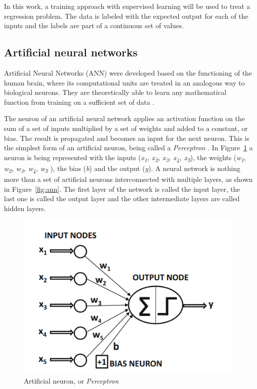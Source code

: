 \documentclass[a4paper,fleqn]{cas-sc}
\begin{document}
In this work, a training approach with supervised learning will be used to treat a regression problem. The data is labeled with the expected output for each of the inputs and the labels are part of a continuous set of values. 

\subsection{Artificial neural networks}
Artificial Neural Networks (ANN) were developed based on the functioning of the human brain, where its computational units are treated in an analogous way to biological neurons. They are theoretically able to learn any mathematical function from training on a sufficient set of data \cite{aggarwal2018}.

The neuron of an artificial neural network applies an activation function on the sum of a set of inputs multiplied by a set of weights and added to a constant, or bias. The result is propagated and becomes an input for the next neuron. This is the simplest form of an artificial neuron, being called a \textit{Perceptron} \cite{aggarwal2018}. In Figure~\ref{fig:perceptron} a neuron is being represented with the inputs (\textit{x\textsubscript{1}, x\textsubscript{2}, x\textsubscript{3}, x\textsubscript{4}, x\textsubscript{5}}), the weights (\textit{w\textsubscript{1}, w\textsubscript{2}, w\textsubscript{3}, w\textsubscript{4}, w\textsubscript{5}} ), the bias (\textit{b}) and the output (\textit{y}). A neural network is nothing more than a set of artificial neurons interconnected with multiple layers, as shown in Figure~\ref{fig:ann}. The first layer of the network is called the input layer, the last one is called the output layer and the other intermediate layers are called hidden layers. 

\begin{figure}[h!]
	\caption{Artificial neuron, or \textit{Perceptron}}
	\label{fig:perceptron}
	\centering%
	\begin{minipage}{.5\textwidth}
		\includegraphics[width=\textwidth]{images/perceptron_aggarwal.png}
	\end{minipage}
\end{figure}
\end{document}
